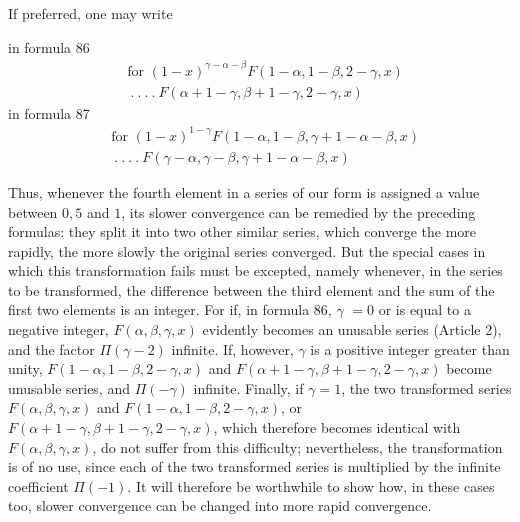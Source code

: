If preferred, one may write

in formula 86
\[
\begin{aligned}&\text{for }(1-x)^{\gamma-\alpha-\beta}F(1-\alpha,1-\beta,2-\gamma,x)\\&\ .\ .\ .\ .\ F(\alpha+1-\gamma,\beta+1-\gamma,2-\gamma,x)\end{aligned}
\]
in formula 87
\[
\begin{aligned}&\text{for }(1-x)^{1-\gamma}F(1-\alpha,1-\beta,\gamma+1-\alpha-\beta,x)\\&\ .\ .\ .\ .\ F(\gamma-\alpha,\gamma-\beta,\gamma+1-\alpha-\beta,x)\end{aligned}
\]


Thus, whenever the fourth element in a series of our form is assigned a value between $0{,}5$ and $1$, its slower convergence can be remedied by the preceding formulas: they split it into two other similar series,
which converge the more rapidly, the more slowly the original series converged. But the special cases in which this transformation fails must be excepted, namely whenever, in the series to be transformed, the difference between the third element and the sum of the first two elements is an integer. For if, in formula 86, $\gamma$ $=0$ or is equal to a negative integer, $F(\alpha,\beta,\gamma,x)$ evidently becomes an unusable series (Article 2), and the factor $\Pi(\gamma-2)$ infinite. If, however, $\gamma$ is a positive integer greater than unity, $F(1-\alpha,1-\beta,2-\gamma,x)$ and $F(\alpha+1-\gamma,\beta+1-\gamma,2-\gamma,x)$ become unusable series, and $\Pi(-\gamma)$ infinite. Finally, if $\gamma=1$, the two transformed series $F(\alpha,\beta,\gamma,x)$ and $F(1-\alpha,1-\beta,2-\gamma,x)$, or $F(\alpha+1-\gamma,\beta+1-\gamma,2-\gamma,x)$, which therefore becomes identical with $F(\alpha,\beta,\gamma,x)$, do not suffer from this difficulty; nevertheless, the transformation is of no use, since each of the two transformed series is multiplied by the infinite coefficient $\Pi(-1)$. It will therefore be worthwhile to show how, in these cases too, slower convergence can be changed into more rapid convergence.

